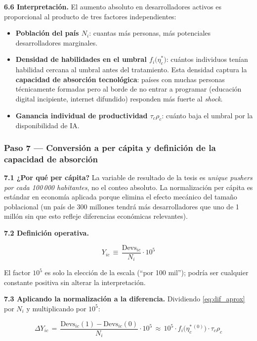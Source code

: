 \documentclass[11pt,a4paper]{article}
\theoremstyle{definition}
\begin{document}
\textbf{6.6 Interpretación.} El aumento absoluto en desarrolladores activos es proporcional al producto de tres factores independientes:
\begin{itemize}[leftmargin=*]
  \item \textbf{Población del país $N_i$}: cuantas más personas, más potenciales desarrolladores marginales.
  \item \textbf{Densidad de habilidades en el umbral $f_i\!\bigl(\eta_c^*\bigr)$}: cuántos individuos tenían habilidad cercana al umbral antes del tratamiento. Esta densidad captura la \textbf{capacidad de absorción tecnológica}: países con muchas personas técnicamente formadas pero al borde de no entrar a programar (educación digital incipiente, internet difundido) responden más fuerte al \textit{shock}.
  \item \textbf{Ganancia individual de productividad $\tau_c\rho_c$}: cuánto baja el umbral por la disponibilidad de IA.
\end{itemize}

\subsubsection*{Paso 7 --- Conversión a per cápita y definición de la capacidad de absorción}

\textbf{7.1 ¿Por qué per cápita?} La variable de resultado de la tesis es \textit{unique pushers por cada 100\,000 habitantes}, no el conteo absoluto. La normalización per cápita es estándar en economía aplicada porque elimina el efecto mecánico del tamaño poblacional (un país de 300 millones tendrá más desarrolladores que uno de 1 millón sin que esto refleje diferencias económicas relevantes).

\textbf{7.2 Definición operativa.}

\begin{equation}
Y_{ic} \,\equiv\, \frac{\text{Devs}_{ic}}{N_i}\cdot 10^5
\label{eq:Y_def}
\end{equation}

El factor $10^5$ es solo la elección de la escala (``por 100 mil''); podría ser cualquier constante positiva sin alterar la interpretación.

\textbf{7.3 Aplicando la normalización a la diferencia.} Dividiendo \eqref{eq:dif_aprox} por $N_i$ y multiplicando por $10^5$:

\begin{equation}
\Delta Y_{ic} \,=\, \frac{\text{Devs}_{ic}(1) - \text{Devs}_{ic}(0)}{N_i}\cdot 10^5 \,\approx\, 10^5\cdot f_i\!\bigl(\eta_c^{*\,(0)}\bigr)\cdot \tau_c\rho_c
\label{eq:DY_inter}
\end{equation}
\end{document}

